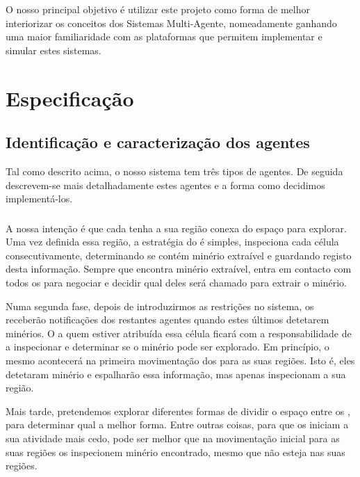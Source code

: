 \documentclass[12pt]{report}
\begin{document}
O nosso principal objetivo é utilizar este projeto como forma de melhor interiorizar os conceitos dos Sistemas Multi-Agente, nomeadamente ganhando uma maior familiaridade com as plataformas que permitem implementar e simular estes sistemas.


\chapter{Especificação}

\section{Identificação e caracterização dos agentes}


Tal como descrito acima, o nosso sistema tem três tipos de agentes. De seguida descrevem-se mais detalhadamente estes agentes e a forma como decidimos implementá-los.

\subsection{\Spotter}
A nossa intenção é que cada \spotter tenha a sua região conexa do espaço para explorar. Uma vez definida essa região, a estratégia do \Spotter é simples, inspeciona cada célula consecutivamente, determinando se contém minério extraível e guardando registo desta informação. Sempre que encontra minério extraível, entra em contacto com todos os \producers para negociar e decidir qual deles será chamado para extrair o minério.

Numa segunda fase, depois de introduzirmos as restrições no sistema, os \spotters receberão notificações dos restantes agentes quando estes últimos detetarem minérios. O \spotter a quem estiver atribuída essa célula ficará com a responsabilidade de a inspecionar e determinar se o minério pode ser explorado. Em princípio, o mesmo acontecerá na primeira movimentação dos \spotters para as suas regiões. Isto é, eles detetaram minério e espalharão essa informação, mas apenas inspecionam a sua região.

Mais tarde, pretendemos explorar diferentes formas de dividir o espaço entre os \spotters, para determinar qual a melhor forma. Entre outras coisas, para que os \producers iniciam a sua atividade mais cedo, pode ser melhor que na movimentação inicial para as suas regiões os \spotters inspecionem minério encontrado, mesmo que não esteja nas suas regiões.
\end{document}
